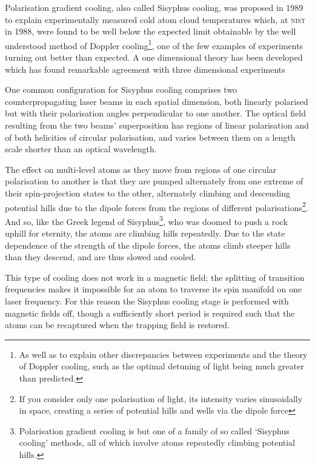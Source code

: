 Polarisation gradient cooling, also called Sisyphus cooling, was proposed in 1989 \cite{dalibard_laser_1989, ungar_optical_1989} to explain experimentally measured cold atom cloud temperatures \cite{lett_optical_1989} which, at \textsc{nist} in 1988, were found to be well below the expected limit obtainable by the well understood method of Doppler cooling\footnote{As well as to explain other discrepancies between experiments and the theory of Doppler cooling, such as the optimal detuning of light being much greater than predicted.}, one of the few examples of experiments turning out better than expected. A one dimensional theory has been developed \cite{dalibard_laser_1989} which has found remarkable agreement with three dimensional experiments \cite{salomon_laser_1990}

One common configuration for Sisyphus cooling comprises two counterpropagating laser beams in each spatial dimension, both linearly polarised but with their polarisation angles perpendicular to one another. The optical field resulting from the two beams' superposition has regions of linear polarisation and of both helicities of circular polarisation, and varies between them on a length scale shorter than an optical wavelength.

The effect on multi-level atoms as they move from regions of one circular polarisation to another is that they are pumped alternately from one extreme of their spin-projection states to the other, alternately climbing and descending potential hills due to the dipole forces from the regions of different polarisations\footnote{If you consider only one polarisation of light, its intensity varies sinusoidally in space, creating a series of potential hills and wells via the dipole force}. And so, like the Greek legend of Sisyphus\footnote{Polarisation gradient cooling is but one of a family of so called `Sisyphus cooling' methods, all of which involve atoms repeatedly climbing potential hills.}, who was doomed to push a rock uphill for eternity, the atoms are climbing hills repeatedly. Due to the state dependence of the strength of the dipole forces, the atoms climb steeper hills than they descend, and are thus slowed and cooled.

This type of cooling does not work in a magnetic field; the splitting of transition frequencies makes it impossible for an atom to traverse its spin manifold on one laser frequency. For this reason the Sisyphus cooling stage is performed with magnetic fields off, though a sufficiently short period is required such that the atoms can be recaptured when the trapping field is restored.

